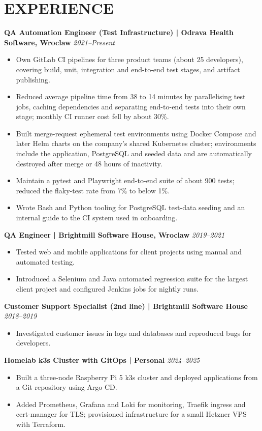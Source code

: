 \documentclass[11pt,a4paper]{article}
\begin{document}
\section*{EXPERIENCE}
\textbf{QA Automation Engineer (Test Infrastructure) | Odrava Health Software, Wroclaw} \hfill \textit{2021–Present}
\begin{itemize}
\item Own GitLab CI pipelines for three product teams (about 25 developers), covering build, unit, integration and end-to-end test stages, and artifact publishing.
\item Reduced average pipeline time from 38 to 14 minutes by parallelising test jobs, caching dependencies and separating end-to-end tests into their own stage; monthly CI runner cost fell by about 30\%.
\item Built merge-request ephemeral test environments using Docker Compose and later Helm charts on the company’s shared Kubernetes cluster; environments include the application, PostgreSQL and seeded data and are automatically destroyed after merge or 48 hours of inactivity.
\item Maintain a pytest and Playwright end-to-end suite of about 900 tests; reduced the flaky-test rate from 7\% to below 1\%.
\item Wrote Bash and Python tooling for PostgreSQL test-data seeding and an internal guide to the CI system used in onboarding.
\end{itemize}

\textbf{QA Engineer | Brightmill Software House, Wroclaw} \hfill \textit{2019–2021}
\begin{itemize}
\item Tested web and mobile applications for client projects using manual and automated testing.
\item Introduced a Selenium and Java automated regression suite for the largest client project and configured Jenkins jobs for nightly runs.
\end{itemize}

\textbf{Customer Support Specialist (2nd line) | Brightmill Software House} \hfill \textit{2018–2019}
\begin{itemize}
\item Investigated customer issues in logs and databases and reproduced bugs for developers.
\end{itemize}

\textbf{Homelab k3s Cluster with GitOps | Personal} \hfill \textit{2024–2025}
\begin{itemize}
\item Built a three-node Raspberry Pi 5 k3s cluster and deployed applications from a Git repository using Argo CD.
\item Added Prometheus, Grafana and Loki for monitoring, Traefik ingress and cert-manager for TLS; provisioned infrastructure for a small Hetzner VPS with Terraform.
\end{itemize}
\end{document}
